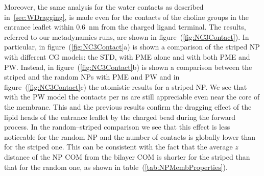 Moreover, the same analysis for the water contacts as described in~\ref{sec:WDragging}, is made even for the 
contacts of the choline groups in the entrance leaflet within $0.6$~nm from the charged ligand terminal. The 
results, referred to our metadynamics runs, are shown in figure~(\ref{fig:NC3Contact}). In particular, in 
figure~(\ref{fig:NC3Contact}a) is shown a comparison of the striped \ac{NP} with different \ac{CG} \martini{} 
models: the \ac{STD}, with \ac{PME} alone and with both \ac{PME} and \ac{PW}. Instead, in 
figure~(\ref{fig:NC3Contact}b) is shown a comparison between the striped and the random \acp{NP} with \ac{PME} and 
\ac{PW} and in figure~(\ref{fig:NC3Contact}c) the atomistic results for a striped \ac{NP}. We see that with the 
\ac{PW} model the contacts per ns are still appreciable even near the core of the membrane. This and the previous 
results confirm the dragging effect of the lipid heads of the entrance leaflet by the charged bead during the 
forward process. In the random--striped comparison we see that this effect is less noticeable for the random 
\ac{NP} and the number of contacts is globally lower than for the striped one. This can be consistent with the 
fact that the average $z$ distance of the \ac{NP} \ac{COM} from the bilayer \ac{COM} is shorter for the striped 
than that for the random one, as shown in table~(\ref{tab:NPMembProperties}).

\clearpage
